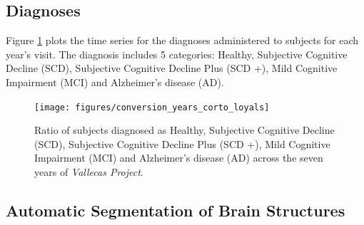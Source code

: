 \documentclass[11pt]{article}
\theoremstyle{definition}
\theoremstyle{remark}
\begin{document}
\subsection{Diagnoses}
\label{sse:diagn}

Figure \ref{fig:diag1} plots the time series for the diagnoses administered to subjects for each year's visit. The diagnosis includes 5 categories: Healthy, Subjective Cognitive Decline (SCD), Subjective Cognitive Decline Plus (SCD +), Mild Cognitive Impairment (MCI) and Alzheimer's disease (AD).

\begin{figure}[!htb]
        \centering
        \texttt{[image: figures/conversion\_years\_corto\_loyals]}
        \caption{Ratio of subjects diagnosed as Healthy, Subjective Cognitive Decline (SCD), Subjective Cognitive Decline Plus (SCD +), Mild Cognitive Impairment (MCI) and Alzheimer's disease (AD) across the seven years of \emph{Vallecas Project}.} 
        \label{fig:diag1}
\end{figure}

\subsection{Automatic Segmentation of Brain Structures}
\label{sse:mri}
\end{document}
